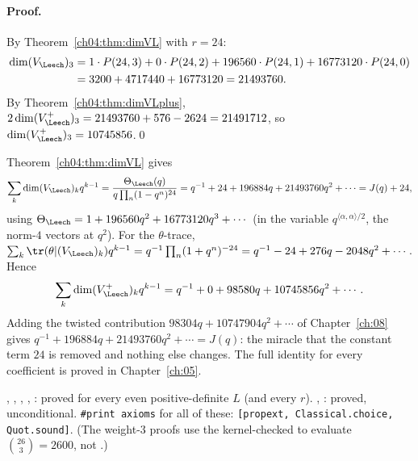 \paragraph{Proof.} By Theorem~\ref{ch04:thm:dimVL} with $r=24$:
\begin{align*}
  \dim(V_\Leech)_3&=1\cdot P(24,3)+0\cdot P(24,2)+196560\cdot P(24,1)+16773120\cdot P(24,0)\\
  &=3200+4717440+16773120=21493760 .
\end{align*}
By Theorem~\ref{ch04:thm:dimVLplus}, $2\dim(V_\Leech^+)_3=21493760+576-2624=21491712$, so
$\dim(V_\Leech^+)_3=10745856$.\qed

\begin{example}\label{ch04:ex:char}
Theorem~\ref{ch04:thm:dimVL} gives
\begin{equation*}
  \sum_k\dim(V_\Leech)_kq^{k-1}=\frac{\Theta_\Leech(q)}{q\prod_n(1-q^n)^{24}}
  =q^{-1}+24+196884q+21493760q^2+\cdots=J(q)+24,
\end{equation*}
using $\Theta_\Leech=1+196560q^2+16773120q^3+\cdots$ (in the variable $q^{\langle\alpha,\alpha\rangle/2}$,
the norm-$4$ vectors at $q^2$). For the $\theta$-trace, $\sum_k\tr(\theta|(V_\Leech)_k)q^{k-1}
=q^{-1}\prod_n(1+q^n)^{-24}=q^{-1}-24+276q-2048q^2+\cdots$. Hence
\begin{equation*}
  \sum_k\dim(V_\Leech^+)_kq^{k-1}=q^{-1}+0+98580q+10745856q^2+\cdots .
\end{equation*}
Adding the twisted contribution $98304q+10747904q^2+\cdots$ of Chapter~\ref{ch:08} gives
$q^{-1}+196884q+21493760q^2+\cdots=J(q)$: the miracle that the constant term $24$ is removed and
nothing else changes. The full identity for every coefficient is proved in Chapter~\ref{ch:05}.
\end{example}

\begin{status}
, ,
, ,
: proved for every even positive-definite $L$ (and every $r$).
, : proved,
unconditional. \texttt{\#print axioms} for all of these: \texttt{[propext, Classical.choice,
Quot.sound]}. (The weight-$3$ proofs use the kernel-checked  to evaluate
$\binom{26}{3}=2600$, not .)
\end{status}
